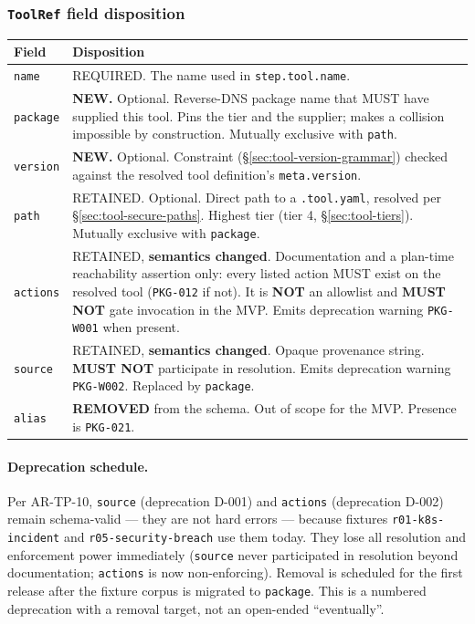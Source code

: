 \subsubsection{\texttt{ToolRef} field disposition}

\begin{center}
\begin{tabular}{p{2cm}p{11.3cm}}
\hline
\textbf{Field} & \textbf{Disposition} \\
\hline
\texttt{name} & REQUIRED. The name used in \texttt{step.tool.name}. \\
\texttt{package} & \textbf{NEW.} Optional. Reverse-DNS package name that MUST have supplied this tool. Pins the tier and the supplier; makes a collision impossible by construction. Mutually exclusive with \texttt{path}. \\
\texttt{version} & \textbf{NEW.} Optional. Constraint (\S\ref{sec:tool-version-grammar}) checked against the resolved tool definition's \texttt{meta.version}. \\
\texttt{path} & RETAINED. Optional. Direct path to a \texttt{.tool.yaml}, resolved per \S\ref{sec:tool-secure-paths}. Highest tier (tier 4, \S\ref{sec:tool-tiers}). Mutually exclusive with \texttt{package}. \\
\texttt{actions} & RETAINED, \textbf{semantics changed}. Documentation and a plan-time reachability assertion only: every listed action MUST exist on the resolved tool (\texttt{PKG-012} if not). It is \textbf{NOT} an allowlist and \textbf{MUST NOT} gate invocation in the MVP. Emits deprecation warning \texttt{PKG-W001} when present. \\
\texttt{source} & RETAINED, \textbf{semantics changed}. Opaque provenance string. \textbf{MUST NOT} participate in resolution. Emits deprecation warning \texttt{PKG-W002}. Replaced by \texttt{package}. \\
\texttt{alias} & \textbf{REMOVED} from the schema. Out of scope for the MVP. Presence is \texttt{PKG-021}. \\
\hline
\end{tabular}
\end{center}

\paragraph{Deprecation schedule.} Per AR-TP-10, \texttt{source} (deprecation
D-001) and \texttt{actions} (deprecation D-002) remain schema-valid --- they
are not hard errors --- because fixtures \texttt{r01-k8s-incident} and
\texttt{r05-security-breach} use them today. They lose all resolution and
enforcement power immediately (\texttt{source} never participated in
resolution beyond documentation; \texttt{actions} is now non-enforcing).
Removal is scheduled for the first release after the fixture corpus is
migrated to \texttt{package}. This is a numbered deprecation with a removal
target, not an open-ended ``eventually''.

